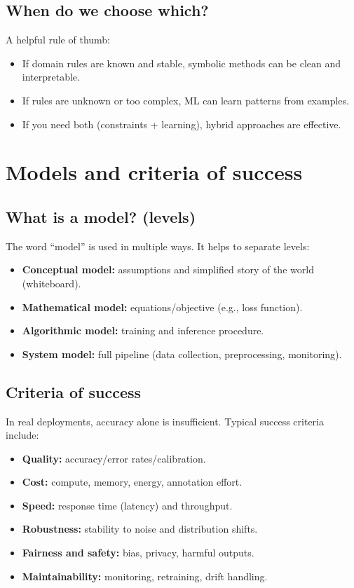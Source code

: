 \documentclass[11pt]{article}
\begin{document}
\subsection{When do we choose which?}
A helpful rule of thumb:
\begin{itemize}[leftmargin=*]
  \item If domain rules are known and stable, symbolic methods can be clean and interpretable.
  \item If rules are unknown or too complex, ML can learn patterns from examples.
  \item If you need both (constraints + learning), hybrid approaches are effective.
\end{itemize}

\section{Models and criteria of success}
\subsection{What is a model? (levels)}
The word ``model'' is used in multiple ways. It helps to separate levels:
\begin{itemize}[leftmargin=*]
  \item \textbf{Conceptual model:} assumptions and simplified story of the world (whiteboard).
  \item \textbf{Mathematical model:} equations/objective (e.g., loss function).
  \item \textbf{Algorithmic model:} training and inference procedure.
  \item \textbf{System model:} full pipeline (data collection, preprocessing, monitoring).
\end{itemize}

\subsection{Criteria of success}
In real deployments, accuracy alone is insufficient. Typical success criteria include:
\begin{itemize}[leftmargin=*]
  \item \textbf{Quality:} accuracy/error rates/calibration.
  \item \textbf{Cost:} compute, memory, energy, annotation effort.
  \item \textbf{Speed:} response time (latency) and throughput.
  \item \textbf{Robustness:} stability to noise and distribution shifts.
  \item \textbf{Fairness and safety:} bias, privacy, harmful outputs.
  \item \textbf{Maintainability:} monitoring, retraining, drift handling.
\end{itemize}
\end{document}
